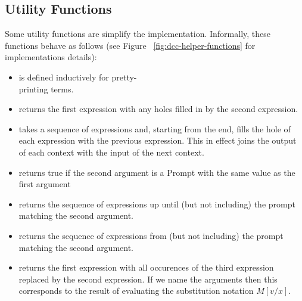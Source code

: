 \subsection{Utility Functions}
Some utility functions are simplify the implementation.
Informally, these functions behave as follows (see Figure ~\ref{fig:dcc-helper-functions} for implementations details):

\begin{itemize}\itemsep0.1cm

\item {} is defined inductively for pretty-\\ printing terms.

\item {} returns the first expression with any holes filled in by the second expression.

\item {} takes a sequence of expressions and, starting from the end, 
fills the hole of each expression with the previous expression. 
This in effect joins the output of each context with the input of the next context.

\item {} returns true if the second argument is a Prompt with the same value as the first argument

\item {} returns the sequence of expressions up until (but not including) the prompt matching the second argument.

\item {} returns the sequence of expressions from (but not including) the prompt matching the second argument.

\item {} returns the first expression with all occurences of the third expression replaced by the second expression. 
If we name the arguments  then this corresponds to the result of evaluating the substitution notation $M[v/x]$.

\end{itemize}

